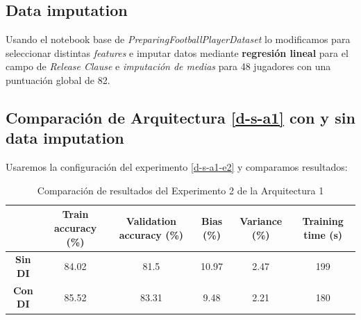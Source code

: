 \documentclass{article}
\begin{document}
		\subsection{Data imputation}
		\label{d-s-dp-di}
			Usando el notebook base de \textit{PreparingFootballPlayerDataset} lo modificamos para seleccionar distintas \textit{features} e imputar datos mediante \textbf{regresi\'on lineal} para el campo de \textit{Release Clause} e \textit{imputaci\'on de medias} para 48 jugadores con una puntuaci\'on global de 82.
			
		\subsection{Comparaci\'on de Arquitectura \ref{d-s-a1} con y sin data imputation}
		\label{d-s-dp-1}
			Usaremos la configuraci\'on del experimento \ref{d-s-a1-e2} y comparamos resultados:
			\begin{table}[!h]
				\begin{center}
					\begin{tabular}{ c | c | c | c | c | c |}
						\ & \textbf{Train accuracy (\%)} & \textbf{Validation accuracy (\%)} & \textbf{Bias (\%)} & \textbf{Variance (\%)} & \textbf{Training time (s)} \\ \hline
						\textbf{Sin DI} & 84.02 & 81.5 & 10.97 & 2.47 & 199\\ \hline
						\textbf{Con DI} & 85.52 & 83.31 & 9.48 & 2.21 & 180 \\ \hline
					\end{tabular}
					\caption{Comparaci\'on de resultados del Experimento 2 de la Arquitectura 1}
					\label{tab:res-d-a1-e2}
				\end{center}
			\end{table}
			
\end{document}
